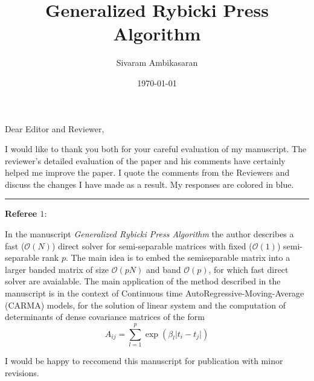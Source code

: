 \documentclass{article}
\title{Generalized Rybicki Press Algorithm}
\author{Sivaram Ambikasaran}
\date{\today}
\begin{document}
\maketitle
\noindent Dear Editor and Reviewer,

I would like to thank you both for your careful evaluation of my manuscript. The reviewer's detailed evaluation of the paper and his comments have certainly helped me improve the paper. I quote the comments from the Reviewers and discuss the changes I have made as a result. {\color{blue}My responses are colored in blue}.

\noindent\rule{16cm}{0.4pt}

\noindent
\textbf{Referee $1$}:


In the manuscript \emph{Generalized Rybicki Press Algorithm} the author describes a fast ($\mathcal{O}(N)$) direct solver for semi-separable matrices with fixed ($\mathcal{O}(1)$) semi-separable rank $p$. The main idea is to embed the semiseparable matrix into a larger banded matrix of size $\mathcal{O}(pN)$ and band $\mathcal{O}(p)$, for which fast direct solver are avaialable. The main application of the method described in the manuscript is in the context of Continuous time AutoRegressive-Moving-Average (CARMA) models, for the solution of linear system and the computation of determinants of dense covariance matrices of the form
$$A_{ij} = \sum_{l=1}^p \exp\left(\beta_l \vert t_i-t_j\vert\right)$$

I would be happy to reccomend this manuscript for publication with minor revisions.

\hrulefill
\end{document}
